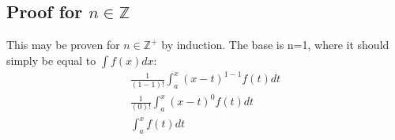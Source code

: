 \documentclass{article}
\begin{document}
\subsection{Proof for $n \in \mathbb{Z}$}

This may be proven for $n \in \mathbb{Z}^+$ by induction. The base is n=1,
where it should simply be equal to $\int f\left(x\right)dx$:
\begin{multline*}
	\frac{1}{(1-1)!}\int_a^x\left(x-t\right)^{1-1}f\left(t\right)dt\\
	\frac{1}{(0)!}\int_a^x\left(x-t\right)^{0}f\left(t\right)dt\\
	\int_a^xf\left(t\right)dt\\
\end{multline*}
\end{document}
